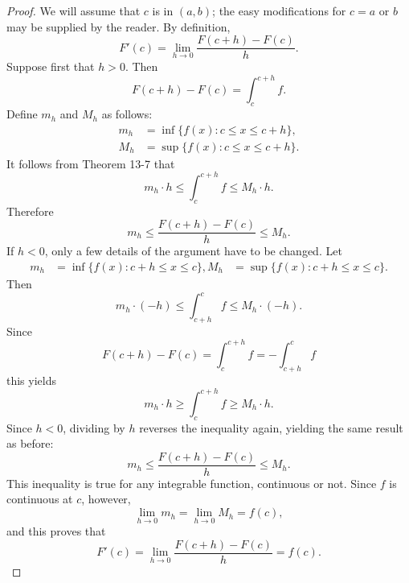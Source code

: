 \documentclass{article}
\begin{document}
\begin{proof}
  We will assume that $c$ is in $(a, b)$; the easy modifications for $c = a$ or
  $b$ may be supplied by the reader. By definition, \begin{equation*}
    F'(c) = \lim_{h \rightarrow 0}\frac{F(c + h) - F(c)}{h}.
  \end{equation*} Suppose first that $h > 0$. Then \begin{equation*}
    F(c + h) - F(c) = \int_c^{c + h} f.
  \end{equation*} Define $m_h$ and $M_h$ as follows: \begin{align*}
    m_h &= \inf\{f(x): c \leq x \leq c + h\}, \\
    M_h &= \sup\{f(x): c \leq x \leq c + h\}.
  \end{align*} It follows from Theorem 13-7 that \begin{equation*}
    m_h \cdot h \leq \int_c^{c + h} f \leq M_h \cdot h.
  \end{equation*} Therefore \begin{equation*}
    m_h \leq \frac{F(c + h) - F(c)}{h} \leq M_h.
  \end{equation*} If $h < 0$, only a few details of the argument have to be
  changed. Let \begin{align*}
    m_h &= \inf\{f(x): c + h \leq x \leq c\},
    M_h &= \sup\{f(x): c + h \leq x \leq c\}.
  \end{align*} Then \begin{equation*}
    m_h \cdot (-h) \leq \int_{c + h}^c f \leq M_h \cdot (-h).
  \end{equation*} Since \begin{equation*}
    F(c + h) - F(c) = \int_c^{c + h} f = -\int_{c + h}^c f
  \end{equation*} this yields \begin{equation*}
    m_h \cdot h \geq \int_c^{c + h} f \geq M_h \cdot h.
  \end{equation*} Since $h < 0$, dividing by $h$ reverses the inequality again,
  yielding the same result as before: \begin{equation*}
    m_h \leq \frac{F(c + h) - F(c)}{h} \leq M_h.
  \end{equation*} This inequality is true for any integrable function,
  continuous or not. Since $f$ is continuous at $c$, however, \begin{equation*}
    \lim_{h \rightarrow 0}m_h = \lim_{h \rightarrow 0}M_h = f(c),
  \end{equation*} and this proves that \begin{equation*}
    F'(c) = \lim_{h \rightarrow 0}\frac{F(c + h) - F(c)}{h} = f(c).
  \end{equation*}
\end{proof}
\end{document}
